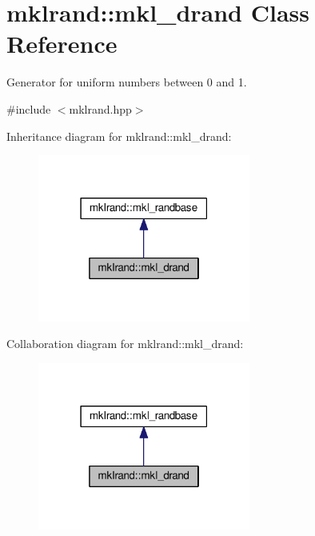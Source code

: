 \hypertarget{classmklrand_1_1mkl__drand}{}\section{mklrand\+:\+:mkl\+\_\+drand Class Reference}
\label{classmklrand_1_1mkl__drand}


Generator for uniform numbers between 0 and 1.  




{\ttfamily \#include $<$mklrand.\+hpp$>$}



Inheritance diagram for mklrand\+:\+:mkl\+\_\+drand\+:
\nopagebreak
\begin{figure}[H]
\begin{center}
\leavevmode
\includegraphics[width=198pt]{dd/de7/classmklrand_1_1mkl__drand__inherit__graph}
\end{center}
\end{figure}


Collaboration diagram for mklrand\+:\+:mkl\+\_\+drand\+:
\nopagebreak
\begin{figure}[H]
\begin{center}
\leavevmode
\includegraphics[width=198pt]{d7/d53/classmklrand_1_1mkl__drand__coll__graph}
\end{center}
\end{figure}
